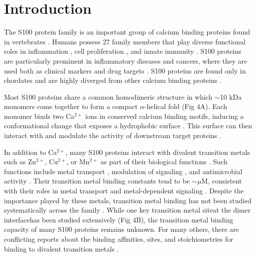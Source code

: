 \section{Introduction}

The S100 protein family is an important group of calcium binding proteins
found in vertebrates \cite{donato_functions_2013,zimmer_evolution_2013}.
Humans possess 27 family members that play diverse functional roles
in inflammation \cite{wolf_chemotactic_2008,leclerc_binding_2009,sorci_danger_2011},
cell proliferation \cite{shaw_s100b-rage-mediated_2003,klingelhofer_epidermal_2009,wang_s100a14_2015},
and innate immunity \cite{yang_s100a12_2007,damo_molecular_2013,zackular_nutritional_2015}.
S100 proteins are particularly prominent in inflammatory diseases
and cancers, where they are used both as clinical markers and drug
targets \cite{marenholz_s100_2004,sedaghat_s100_2008,donato_rage:_2007,west_s100a7_2010,averill_s100a9_2011,riuzzi_s100b_2011,boye_s100a4_2010,yamaoka_gene_2013,gross_joining_2013,bresnick_s100_2015}.
S100 proteins are found only in chordates and are highly diverged
from other calcium binding proteins \cite{zimmer_evolution_2013,marenholz_s100_2004}.

Most S100 proteins share a common homodimeric structure in which $\sim$10
kDa monomers come together to form a compact $\alpha$-helical fold
(Fig 4A). Each monomer binds two Ca$^{2+}$ ions in conserved calcium
binding motifs, inducing a conformational change that exposes a hydrophobic
surface \cite{bertini_solution_2012,santamaria-kisiel_calcium-dependent_2006,rustandi_ca2+-dependent_1998}.
This surface can then interact with and modulate the activity of downstream
target proteins \cite{zimmer_molecular_2003,zimmer_calcium-dependent_2010}.

In addition to Ca$^{2+}$, many S100 proteins interact with divalent
transition metals such as Zn$^{2+}$, Cu$^{2+}$, or Mn$^{2+}$ as
part of their biological functions \cite{moroz_role_2010,gilston_binding_2016}.
Such functions include metal transport \cite{sivaraja_copper_2006},
modulation of signaling \cite{heierhorst_interaction_1997}, and antimicrobial
activity \cite{damo_molecular_2013}. Their transition metal binding
constants tend to be $\sim$$\mu$M, consistent with their roles in
metal transport and metal-dependent signaling \cite{ohalloran_metallochaperones_2000,maret_zinc_2013}.
Despite the importance played by these metals, transition metal binding
has not been studied systematically across the family \cite{moroz_role_2010,gilston_binding_2016}.
While one key transition metal site\textemdash at the dimer interface\textemdash has
been studied extensively (Fig 4B), the transition metal binding capacity
of many S100 proteins remains unknown. For many others, there are
conflicting reports about the binding affinities, sites, and stoichiometries
for binding to divalent transition metals \cite{moroz_role_2010,gilston_binding_2016}.

